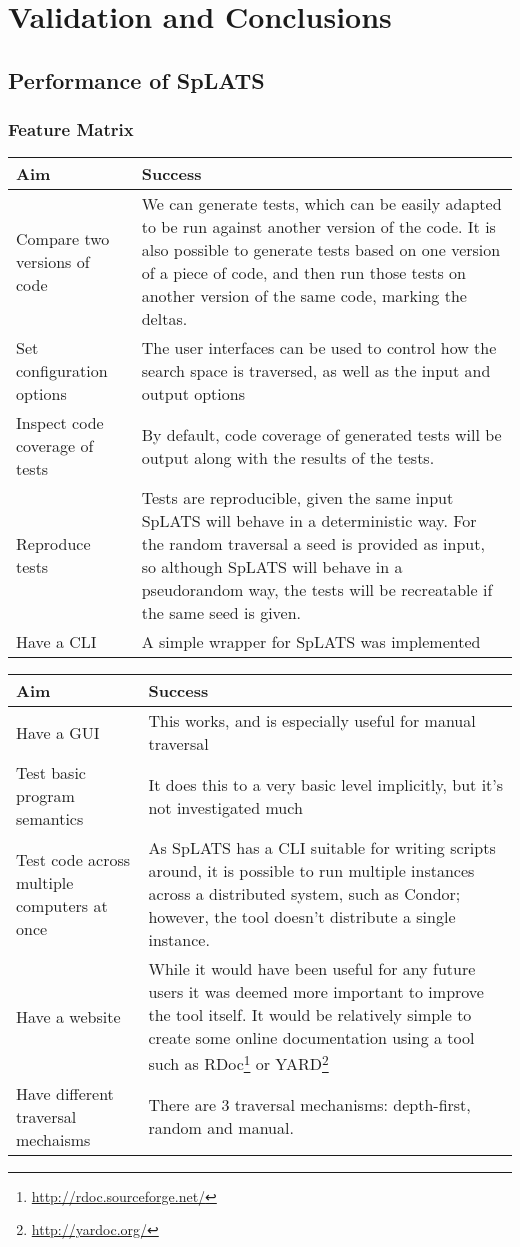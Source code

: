 \chapter{Validation and Conclusions}
\section{Performance of SpLATS}
  \subsection{Feature Matrix}
    \begin{tabular}{p{} | p{}}
    Aim & Success \\
    \hline
    Compare two versions of code &
    We can generate tests, which can be easily adapted to be run against another version of the code.
    It is also possible to generate tests based on one version of a piece of code, and then run those tests on another version of the same code, marking the deltas. \\
    Set configuration options & The user interfaces can be used to control how the search space is traversed, as well as the input and output options \\
    Inspect code coverage of tests & By default, code coverage of generated tests will be output along with the results of the tests. \\
    Reproduce tests & Tests are reproducible, given the same input SpLATS will behave in a deterministic way. For the random traversal a seed is provided as input, so although SpLATS will behave
    in a pseudorandom way, the tests will be recreatable if the same seed is given.\\
    Have a CLI &
    A simple wrapper for SpLATS was implemented \\
    \hline
    \end{tabular}

    \begin{tabular}{p{} | p{}}
    Aim & Success \\
    \hline
    Have a GUI &
    This works, and is especially useful for manual traversal \\
    Test basic program semantics &
    It does this to a very basic level implicitly, but it's not investigated much \\
    Test code across multiple computers at once &
    As SpLATS has a CLI suitable for writing scripts around, it is possible to run multiple instances across a distributed system, such as Condor; however, the tool doesn't distribute a single instance. \\
    \hline
    Have a website &
    While it would have been useful for any future users it was deemed more important to improve the tool itself. It would be relatively simple to create some online documentation using a tool such as 
    RDoc\footnote{\url{http://rdoc.sourceforge.net/}} or YARD\footnote{\url{http://yardoc.org/}} \\
    Have different traversal mechaisms &
    There are 3 traversal mechanisms: depth-first, random and manual. \\
    \end{tabular}

